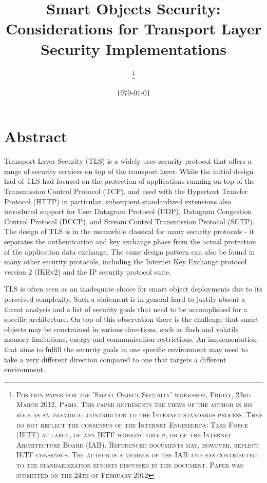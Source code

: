 \documentclass[a4paper, 10pt]{IEEEtran}
\begin{document}
\title{Smart Objects Security: Considerations for Transport Layer Security Implementations}

\author{
\thanks{\textsc{
Position paper for the 'Smart Object Security' workshop, Friday, 23rd March 2012, Paris. This paper represents the views of the author in his role as an individual contributor to the Internet standards process. They do not reflect the consensus of the Internet Engineering Task Force (IETF) at large, of any IETF working group, or of the Internet Architecture Board (IAB). Referenced documents may, however, reflect IETF consensus. The author is a member of the IAB and has contributed to the standardization efforts discussed in this document. Paper was submitted on the 24th of February 2012}}
}

\date{\today}

\maketitle

\section{Abstract}

Transport Layer Security (TLS) is a widely uses security protocol that offers a range of security services on top of the transport layer. While the initial design had of TLS had focused on the protection of applications running on top of the Transmission Control Protocol (TCP), and used with the Hypertext Transfer Protocol (HTTP) in particular, subsequent standardized extensions also introduced support for User Datagram Protocol (UDP), Datagram Congestion Control Protocol (DCCP), and Stream Control Transmission Protocol (SCTP). The design of TLS is in the meanwhile classical for many security protocols - it separates the authentication and key exchange phase from the actual protection of the application data exchange. The same design pattern can also be found in many other security protocols, including the Internet Key Exchange protocol version 2 (IKEv2) and the IP security protocol suite. 

TLS is often seen as an inadequate choice for smart object deployments due to its perceived complexity. Such a statement is in general hard to justify absent a threat analysis and a list of security goals that need to be accomplished for a specific architecture. On top of this observation there is the challenge that smart objects may be constrained in various directions, such as flash and volatile memory limitations, energy and communication restrictions. An implementation that aims to fulfill the security goals in one specific environment may need to take a very different direction compared to one that targets a different environment. 
\end{document}
